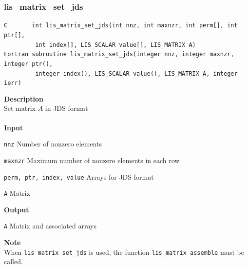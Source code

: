 \documentclass[a4paper]{article}
\newcommand{\namelistlabel}[1]{\mbox{#1}\hfill}
\newenvironment{namelist}[1]{%
 \begin{list}{}
  {\let\makelabel\namelistlabel
  \settowidth{\labelwidth}{#1}
  \setlength{\leftmargin}{1.1\labelwidth}}
}{%
\end{list}}
\begin{document}
  \subsubsection{lis\_matrix\_set\_jds}
\begin{screen}
\verb|C       int lis_matrix_set_jds(int nnz, int maxnzr, int perm[], int ptr[], |\\
\verb|         int index[], LIS_SCALAR value[], LIS_MATRIX A)|\\
\verb|Fortran subroutine lis_matrix_set_jds(integer nnz, integer maxnzr, integer ptr(),|\\
\verb|         integer index(), LIS_SCALAR value(), LIS_MATRIX A, integer ierr)|
\end{screen}
{\bf Description}\\
\indent
Set matrix $A$ in JDS format
\\ \\
\noindent
{\bf Input}
\begin{namelist}{XXXXXXXXXXXXXXXXXXXX}
\item[\tt nnz] Number of nonzero elements
\item[\tt maxnzr] Maximum number of nonzero elements in each row
\item[\tt perm, ptr, index, value] Arrays for JDS format
\item[\tt A] Matrix
\end{namelist}
{\bf Output}
\begin{namelist}{XXXXXXXXXXXXXXXXXXXX}
\item[\tt A] Matrix and associated arrays
\end{namelist}
\noindent
{\bf Note}\\
\indent
When \verb|lis_matrix_set_jds| is used, 
the function \verb|lis_matrix_assemble| must be called. 

\end{document}
